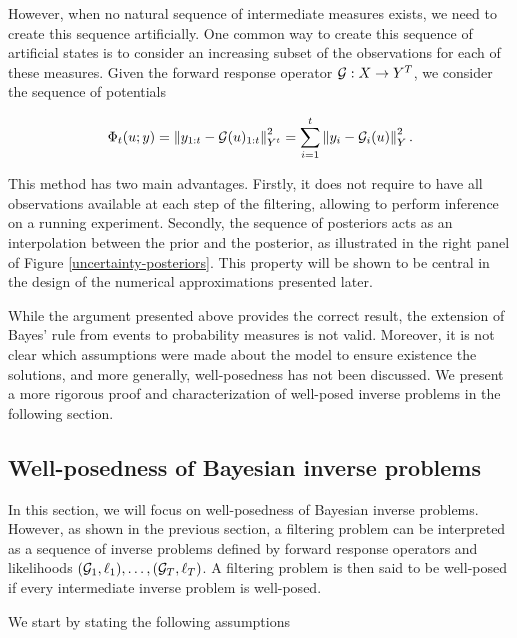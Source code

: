 However, when no natural sequence of intermediate measures exists, we need to create this sequence artificially. One common way to create this sequence of artificial states is to consider an increasing subset of the observations for each of these measures. Given the forward response operator $\mathcal{G} : X \rightarrow Y^T$, we consider the sequence of potentials

\begin{equation}\label{phi-seq}
  \Phi_t(u; y) = \left\lVert y_{1:t} - \mathcal{G}(u)_{1:t}\right\rVert_{Y^t}^2 = \sum_{i=1}^t\left\lVert y_i - \mathcal{G}_i(u)\right\rVert_Y^2.
\end{equation}

This method has two main advantages. Firstly, it does not require to have all observations available at each step of the filtering, allowing to perform inference on a running experiment. Secondly, the sequence of posteriors acts as an interpolation between the prior and the posterior, as illustrated in the right panel of Figure \ref{uncertainty-posteriors}. This property will be shown to be central in the design of the numerical approximations presented later.

While the argument presented above provides the correct result, the extension of Bayes' rule from events to probability measures is not valid. Moreover, it is not clear which assumptions were made about the model to ensure existence the solutions, and more generally, well-posedness has not been discussed. We present a more rigorous proof and characterization of well-posed inverse problems in the following section.

\subsection{Well-posedness of Bayesian inverse problems}

In this section, we will focus on well-posedness of Bayesian inverse problems. However, as shown in the previous section, a filtering problem can be interpreted as a sequence of inverse problems defined by forward response operators and likelihoods $(\mathcal{G}_1, \ell_1), \ldots, (\mathcal{G}_T, \ell_T)$. A filtering problem is then said to be well-posed if every intermediate inverse problem is well-posed.

We start by stating the following assumptions

